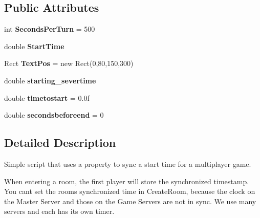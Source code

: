 \subsection*{Public Attributes}
\begin{DoxyCompactItemize}
\item 
int {\bfseries Seconds\+Per\+Turn} = 500\hypertarget{class_in_room_round_timer_a3fbc46448a70dff996a45f508d3e3cc8}{}\label{class_in_room_round_timer_a3fbc46448a70dff996a45f508d3e3cc8}

\item 
double {\bfseries Start\+Time}\hypertarget{class_in_room_round_timer_a22ba8013f8081643dfffeb95e049a97c}{}\label{class_in_room_round_timer_a22ba8013f8081643dfffeb95e049a97c}

\item 
Rect {\bfseries Text\+Pos} = new Rect(0,80,150,300)\hypertarget{class_in_room_round_timer_a1844d64936fc01a304de92179ac0cd4e}{}\label{class_in_room_round_timer_a1844d64936fc01a304de92179ac0cd4e}

\item 
double {\bfseries starting\+\_\+severtime}\hypertarget{class_in_room_round_timer_a2399b0658c888b108f2c75f9d2fbb41c}{}\label{class_in_room_round_timer_a2399b0658c888b108f2c75f9d2fbb41c}

\item 
double {\bfseries timetostart} = 0.\+0f\hypertarget{class_in_room_round_timer_aa0c3ea404ae1bc85c1cc36626ae2bed8}{}\label{class_in_room_round_timer_aa0c3ea404ae1bc85c1cc36626ae2bed8}

\item 
double {\bfseries secondsbeforeend} = 0\hypertarget{class_in_room_round_timer_a913c06f7ecff0d23be4041c9eb5fb69a}{}\label{class_in_room_round_timer_a913c06f7ecff0d23be4041c9eb5fb69a}

\end{DoxyCompactItemize}


\subsection{Detailed Description}
Simple script that uses a property to sync a start time for a multiplayer game. 

When entering a room, the first player will store the synchronized timestamp. You can\textquotesingle{}t set the room\textquotesingle{}s synchronized time in Create\+Room, because the clock on the Master Server and those on the Game Servers are not in sync. We use many servers and each has it\textquotesingle{}s own timer.

